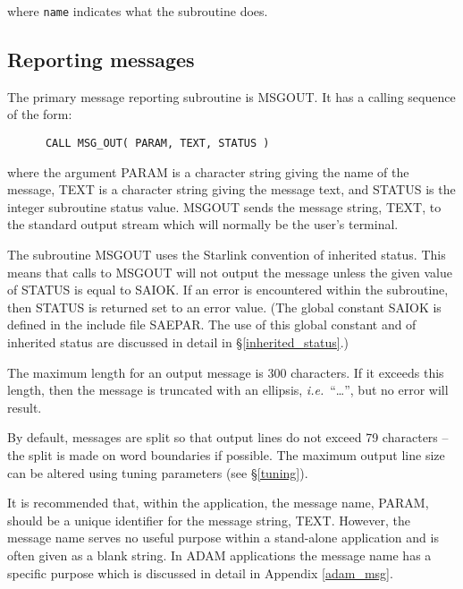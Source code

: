 \documentclass[twoside,11pt]{article}
\newcommand{\htmlref}[2]{#1}
\newcommand{\latex}[1]{#1}
\newcommand{\xlabel}[1]{}
\renewcommand{\_}{\texttt{\symbol{95}}}
\begin{document}
where \texttt{name} indicates what the subroutine does.


\subsection{\xlabel{reporting_messages}Reporting messages}

The primary message reporting subroutine is MSG\_OUT. 
It has a calling sequence of the form:

\begin {small}
\begin{verbatim}
      CALL MSG_OUT( PARAM, TEXT, STATUS )
\end{verbatim}
\end {small}

where the argument PARAM is a character string giving the name of the message,
TEXT is a character string giving the message text, and STATUS is the
integer subroutine status value. 
MSG\_OUT sends the message string, TEXT, to the standard output stream which
will normally be the user's terminal.

The subroutine MSG\_OUT uses the Starlink convention of 
\htmlref{inherited status}{inherited_status}. 
This means that calls to MSG\_OUT will not output the message unless the 
given value of STATUS is equal to SAI\_\_OK.
If an error is encountered within the subroutine, then STATUS is returned
set to an error value. 
(The global constant SAI\_\_OK is defined in the include file SAE\_PAR. 
\latex{The use of this global constant and of inherited status are discussed in detail
in \S\ref{inherited_status}.}) 

The maximum length for an output message is 300 characters.
If it exceeds this length, then the message is truncated with
an ellipsis, \textit{i.e.}\ ``\ldots'', but no error will result.

By default, messages are split so that output lines do not exceed 
79 characters -- the split is made on word boundaries if possible. 
The maximum output line size can be altered using
\htmlref{tuning parameters}{tuning}\latex{ (see \S\ref{tuning})}.

It is recommended that,
within the application, the message name, PARAM, should be a unique identifier 
for the message string, TEXT. 
However, the message name serves no useful purpose within a stand-alone 
application and is often given as a blank string.
In ADAM applications the message name has a
\htmlref
{specific purpose}{mespar_sect}\latex{ which is discussed in detail in Appendix \ref{adam_msg}}.
\end{document}
